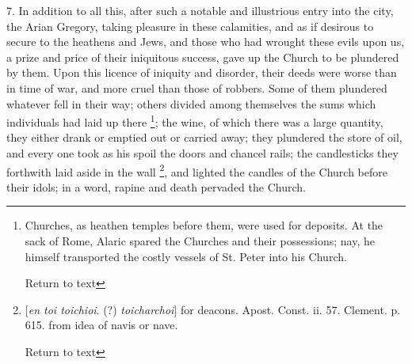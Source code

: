 7. In addition to all this, after such a notable
and illustrious entry into the city, the Arian Gregory, taking
pleasure in these calamities, and as if desirous to secure to the
heathens and Jews, and those who had wrought these evils upon us, a
prize and price of their iniquitous success, gave up the Church to be
plundered by them. Upon this licence of iniquity and disorder, their
deeds were worse than in time of war, and more cruel than those of
robbers. Some of them plundered whatever fell in their way; others
divided among themselves the sums which individuals had laid up there
\footnote{Churches, as heathen temples before them, were used for deposits. At
the sack of Rome, Alaric spared the Churches and their possessions;
nay, he himself transported the costly vessels of St. Peter into his
Church.

Return to text}; the wine, of which there
was a large quantity, they either drank or emptied out or carried
away; they plundered the store of oil, and every one took as his spoil
the doors and chancel rails; the candlesticks they forthwith laid
aside in the wall \footnote{[\emph{en toi toichioi}. (?) \emph{toicharchoi}] for deacons. Apost.
Const. ii. 57. Clement. p. 615. from idea of navis or nave.

Return to text}, and
lighted the candles of the Church before their idols; in a word,
rapine and death pervaded the Church.

